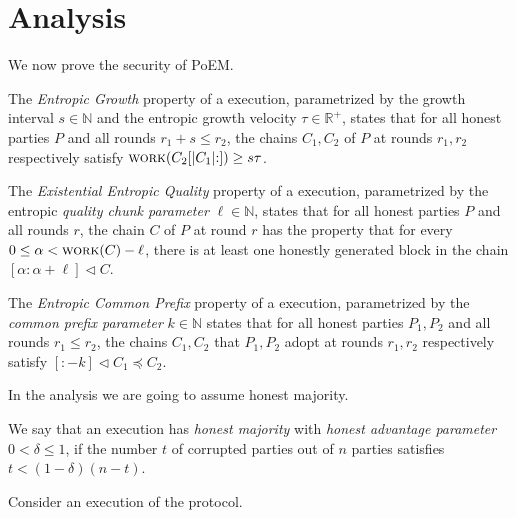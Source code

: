 \section{Analysis}

We now prove the security of PoEM.

\begin{definition}
  The \emph{Entropic Growth} property of
  a \poem execution,
  parametrized by the growth interval $s \in \mathbb{N}$
  and the entropic growth velocity $\tau \in \mathbb{R}^+$,
  states that for
  all honest parties $P$ and all rounds $r_1 + s \leq r_2$,
  the chains $C_1, C_2$ of $P$ at rounds $r_1, r_2$ respectively
  satisfy $\textsc{work}(C_2[{|C_1|}{:}]) \geq s \tau$.
\end{definition}

\begin{definition}
  The \emph{Existential Entropic Quality} property of
  a \poem execution, parametrized by the entropic \emph{quality chunk parameter} $\ell \in \mathbb{N}$,
  states that for
  all honest parties $P$ and all rounds $r$,
  the chain $C$ of $P$ at round $r$
  has the property that
  for every $0 \leq \alpha < \textsc{work}(C) - \ell$,
  there is at least one honestly generated block in the chain
  $[{\alpha}{:}{\alpha + \ell}] \lhd C$.
\end{definition}

\begin{definition}
  The \emph{Entropic Common Prefix} property of
  a \poem execution, parametrized by the \emph{common prefix parameter} $k \in \mathbb{N}$
  states that for
  all honest parties $P_1, P_2$
  and all rounds $r_1 \leq r_2$,
  the chains $C_1, C_2$ that $P_1, P_2$ adopt at rounds $r_1, r_2$ respectively
  satisfy $[{:}{-k}] \lhd C_1 \preceq C_2$.
\end{definition}

In the analysis we are going to assume honest majority.

\begin{definition}
  We say that an execution has \emph{honest majority} with \emph{honest advantage parameter}
  $0 < \delta \leq 1$, if the number $t$ of corrupted parties out of
  $n$ parties satisfies $t < (1 - \delta) (n - t)$.
\end{definition}

Consider an execution of the \poem protocol.

